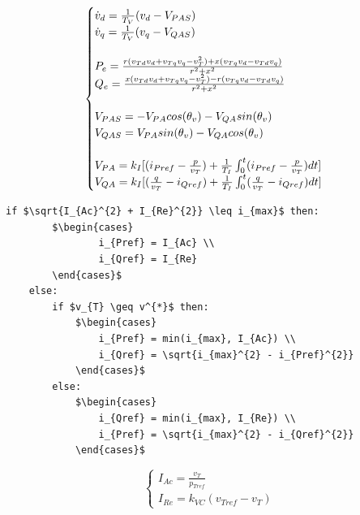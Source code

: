 \begin{equation}
	\begin{cases}
		\dot{v}_{d} = \frac{1}{T_{V}}(v_{d} - V_{PAS}) \\
		\dot{v}_{q} = \frac{1}{T_{V}}(v_{q} - V_{QAS}) \\
		\\
		P_{e} = \frac{r(v_{Td}v_{d} + v_{Tq}v_{q} - v_{T}^{2}) + x(v_{Tq}v_{d} - v_{Td}v_{q})}{r^{2} + x^{2}} \\
		Q_{e} = \frac{x(v_{Td}v_{d} + v_{Tq}v_{q} - v_{T}^{2}) - r(v_{Tq}v_{d} - v_{Td}v_{q})}{r^{2} + x^{2}} \\
		\\
		V_{PAS} = -V_{PA}cos(\theta_{v}) - V_{QA}sin(\theta_{v}) \\
		V_{QAS} = V_{PA}sin(\theta_{v}) - V_{QA}cos(\theta_{v}) \\
		\\
		V_{PA} = k_{I}[(i_{Pref} - \frac{p}{v_{T}}) +\frac{1}{T_{I}}\int\displaylimits_{0}^{t}	(i_{Pref} - \frac{p}{v_{T}})dt]\\
		V_{QA} = k_{I}[(\frac{q}{v_{T}} - i_{Qref}) +\frac{1}{T_{I}}\int\displaylimits_{0}^{t}	(\frac{q}{v_{T}} - i_{Qref})dt]
	\end{cases}
\end{equation}

\begin{center}
	\begin{lstlisting}[mathescape, columns=fullflexible]
	if $\sqrt{I_{Ac}^{2} + I_{Re}^{2}} \leq i_{max}$ then:
		$\begin{cases}
				i_{Pref} = I_{Ac} \\
				i_{Qref} = I_{Re}
		\end{cases}$
	else:
		if $v_{T} \geq v^{*}$ then:	
			$\begin{cases}
				i_{Pref} = min(i_{max}, I_{Ac}) \\
				i_{Qref} = \sqrt{i_{max}^{2} - i_{Pref}^{2}}
			\end{cases}$
		else:
			$\begin{cases}
				i_{Qref} = min(i_{max}, I_{Re}) \\
				i_{Pref} = \sqrt{i_{max}^{2} - i_{Qref}^{2}}
			\end{cases}$
	\end{lstlisting}
\end{center}

\begin{equation*}
	\begin{cases}
		I_{Ac} = \frac{v_{T}}{p_{Tref}} \\
		I_{Re} = k_{VC}(v_{Tref} - v_{T})
	\end{cases}
\end{equation*}

